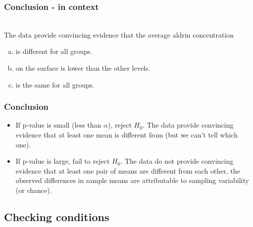 \documentclass[slidestop,compress,mathserif]{beamer}
\begin{document}

\begin{frame}
\frametitle{Conclusion - in context}


$\:$ \\

The data provide convincing evidence that the average aldrin concentration
\begin{enumerate}[(a)]

\item  is different for all groups.

\item on the surface is lower than the other levels.


\item is the same for all groups.

\end{enumerate}

\end{frame}


\begin{frame}
\frametitle{Conclusion}

\begin{itemize}

\item  If p-value is small (less than $\alpha$), reject $H_0$. The data provide convincing evidence that at least one mean is different from (but we can't tell which one).

\pause

\item If p-value is large, fail to reject $H_0$. The data do not provide convincing evidence that at least one pair of means are different from each other, the observed differences in sample means are attributable to sampling variability (or chance).

\end{itemize}

\end{frame}


\subsection{Checking conditions}
\end{document}

